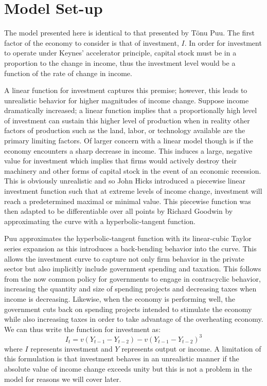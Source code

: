 \section{Model Set-up}
The model presented here is identical to that presented by T\"onu Puu\autocite{Puu2003}. The first factor of the economy to consider is that of investment, $I$. In order for investment to operate under Keynes' accelerator principle, capital stock must be in a proportion to the change in income, thus the investment level would be a function of the rate of change in income. 

A linear function for investment captures this premise; however, this leads to unrealistic behavior for higher magnitudes of income change. Suppose income dramatically increased; a linear function implies that a proportionally high level of investment can sustain this higher level of production when in reality other factors of production such as the land, labor, or technology available are the primary limiting factors. Of larger concern with a linear model though is if the economy encounters a sharp decrease in income. This induces a large, negative value for investment which implies that firms would actively destroy their machinery and other forms of capital stock in the event of an economic recession. This is obviously unrealistic and so John Hicks introduced a piecewise linear investment function such that at extreme levels of income change, investment will reach a predetermined maximal or minimal value. This piecewise function was then adapted to be differentiable over all points by Richard Goodwin by approximating the curve with a hyperbolic-tangent function\autocite{Puu2003}.

Puu approximates the hyperbolic-tangent function with its linear-cubic Taylor series expansion as this introduces a back-bending behavior into the curve. This allows the investment curve to capture not only firm behavior in the private sector but also implicitly include government spending and taxation. This follows from the now common policy for governments to engage in contracyclic behavior, increasing the quantity and size of spending projects and decreasing taxes when income is decreasing. Likewise, when the economy is performing well, the government cuts back on spending projects intended to stimulate the economy while also increasing taxes in order to take advantage of the overheating economy. We can thus write the function for investment as:
\begin{equation}
    I_t = v(Y_{t-1}-Y_{t-2})-v(Y_{t-1}-Y_{t-2})^3
\end{equation}
where $I$ represents investment and $Y$ represents output or income. A limitation of this formulation is that investment behaves in an unrealistic manner if the absolute value of income change exceeds unity but this is not a problem in the model for reasons we will cover later.

